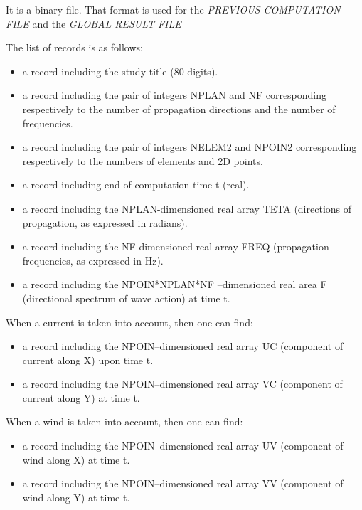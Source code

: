  \textbf{}

It is a binary file. That format is used for the \textit{PREVIOUS COMPUTATION FILE} and the \textit{GLOBAL RESULT FILE}

 The list of records is as follows:

\begin{itemize}
\item  a record including the study title (80 digits).
\item  a record including the pair of integers NPLAN and NF corresponding respectively to the number of propagation directions and the number of frequencies.
\item  a record including the pair of integers NELEM2 and NPOIN2 corresponding respectively to the numbers of elements and 2D points.
\item  a record including end-of-computation time t (real).
\item  a record including the NPLAN-dimensioned real array TETA (directions of propagation, as expressed in radians).

\item  a record including the NF-dimensioned real array FREQ (propagation frequencies, as expressed in Hz).

\item  a record including the NPOIN*NPLAN*NF --dimensioned real area F (directional spectrum of wave action) at time t.
\end{itemize}

 When a current is taken into account, then one can find:

\begin{itemize}
\item  a record including the NPOIN--dimensioned real array UC (component of current along X) upon time t.

\item  a record including the NPOIN--dimensioned real array VC (component of current along Y) at time t.
\end{itemize}

 When a wind is taken into account, then one can find:

\begin{itemize}
\item  a record including the NPOIN--dimensioned real array UV (component of wind along X) at time t.
\item  a record including the NPOIN--dimensioned real array VV (component of wind along Y) at time t.
\end{itemize}

